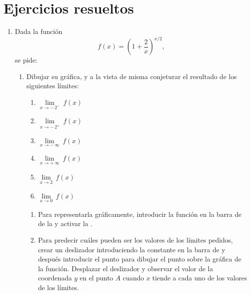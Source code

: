 

\section{Ejercicios resueltos}
\begin{enumerate}[leftmargin=*]
\item Dada la función
      \[
      f(x)=\left( 1+\frac{2}{x}\right) ^{x/2},
      \]
      se pide:

      \begin{enumerate}
      \item Dibujar su gráfica, y a la vista de misma conjeturar el resultado de los siguientes límites:
            \begin{multicols}{2}
            \begin{enumerate}
            \item  $\lim\limits_{x\rightarrow -\,2^{-}}\ f(x)$
            \item  $\lim\limits_{x\rightarrow -\,2^{+}}\ f(x)$
            \item  $\lim\limits_{x\rightarrow -\,\infty }\ f(x)$
            \item  $\lim\limits_{x\rightarrow +\,\infty }\ f(x)$
            \item  $\lim\limits_{x\rightarrow 2}\ f(x)$
            \item  $\lim\limits_{x\rightarrow 0}\ f(x)$
            \end{enumerate}
            \end{multicols}

            \begin{indication}
            \begin{enumerate}
            \item Para representarla gráficamente, introducir la función  en la barra de  de la  y activar la .
            \item Para predecir cuáles pueden ser los valores de los límites pedidos, crear un deslizador introduciendo la constante  en la barra de  y después introducir el punto  para dibujar el punto sobre la gráfica de la función. Desplazar el deslizador y observar el valor de la coordenada $y$ en el punto $A$ cuando $x$ tiende a cada uno de los valores de los límites.
            \end{enumerate}
            \end{indication}


\end{enumerate}
\end{enumerate}
